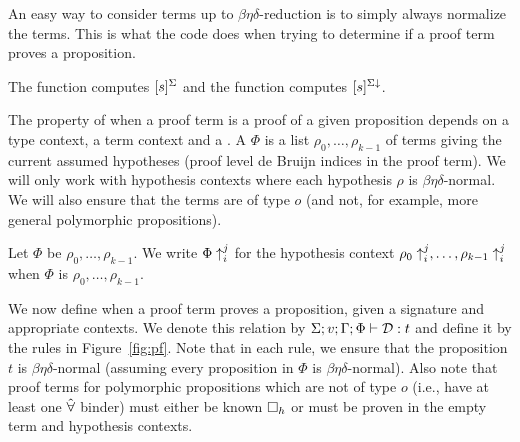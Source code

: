 An easy way to consider terms up to $\beta\eta\delta$-reduction is to simply
always normalize the terms. This is what the code does when trying to determine
if a proof term proves a proposition.

The function {} computes $\dnorm\Sigma{s}$
and the function {} computes $\bednorm\Sigma{s}$.

The property of when a proof term is a proof of a given
proposition depends on a type context, a term context
and a {}.
A {} $\Phi$ is a list
$\rho_0,\ldots,\rho_{k-1}$
of terms
giving the current assumed hypotheses
(proof level de Bruijn indices in the proof term).
We will only work with hypothesis contexts where each hypothesis $\rho$
is $\beta\eta\delta$-normal.
We will also ensure that the terms are of type $o$ (and not, for example,
more general polymorphic propositions).

Let $\Phi$ be $\rho_0,\ldots,\rho_{k-1}$.
We write $\dbsh{i}{j}\Phi$ for the hypothesis context
$\dbsh{i}{j}{\rho_0},\ldots,\dbsh{i}{j}{\rho_{k-1}}$
when $\Phi$ is $\rho_0,\ldots,\rho_{k-1}$.

We now define when a proof term proves a proposition,
given a signature and appropriate contexts.
We denote this relation by
$\Sigma;v;\Gamma;\Phi\vdash \cD : t$
and define it by the rules in Figure~\ref{fig:pf}.
Note that in each rule, we ensure that the proposition $t$ is $\beta\eta\delta$-normal
(assuming every proposition in $\Phi$ is $\beta\eta\delta$-normal).
Also note that proof terms for polymorphic propositions which are not of type $o$
(i.e., have at least one $\tforall$ binder) must either be known $\known{h}$
or must be proven in the empty term and hypothesis contexts.

